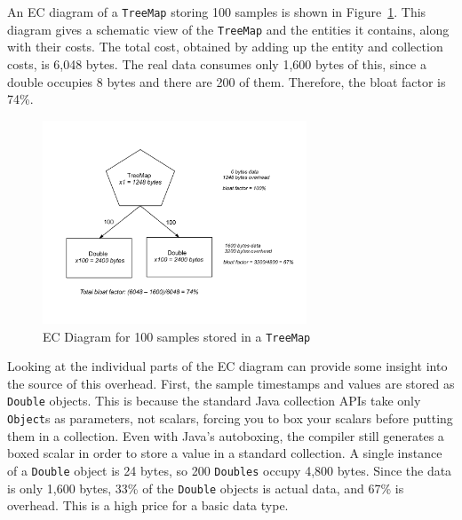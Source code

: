 \documentclass{book}
\theoremstyle{definition}
\begin{document}
An EC diagram of a \texttt{TreeMap} storing 100 samples is shown in Figure~\ref{fig:content-schematic-treemap-doubles}.  This diagram gives a schematic view of the \texttt{TreeMap} and the entities it contains, along with their costs. The total cost, obtained by adding up the entity and collection costs, is 6,048 bytes. The real data consumes only 1,600 bytes of this, since a double occupies 8 bytes and there are 200 of them. Therefore, the bloat factor is 74\%.  

\begin{figure}
  \centering
  \includegraphics[width=0.7\textwidth]{Figures/chapter3/treemap-doubles}
  \caption{EC Diagram for 100 samples stored in a \texttt{TreeMap}}
  \label{fig:content-schematic-treemap-doubles}
\end{figure} 
 
Looking at the individual parts of the EC diagram can provide some insight into the source of this overhead. First, the sample timestamps and values are stored as \texttt{Double} objects. This is because the standard Java collection APIs take only \texttt{Object}s as parameters, not scalars, forcing you to box your scalars before putting them in a collection. Even with Java's autoboxing, the compiler still generates a boxed scalar in order to store a value in a standard collection.  A single instance of a \texttt{Double} object is 24 bytes, so 200 \texttt{Doubles} occupy 4,800 bytes. Since the data is only 1,600 bytes,  33\% of the \texttt{Double} objects is actual data, and 67\% is overhead. This is a high price for a basic data type. 


\end{document}
